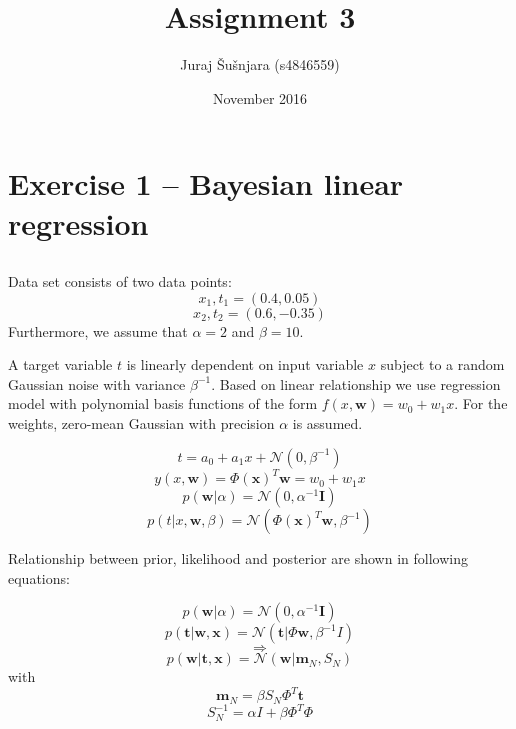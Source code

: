 \documentclass{article}
\title{Assignment 3}
\author{Juraj Šušnjara (s4846559)}
\date{November 2016}
\begin{document}
\maketitle

\section{Exercise 1 – Bayesian linear regression}
\subsection{}

Data set consists of two data points:
\begin{equation}
    {x_1, t_1} = (0.4, 0.05)
\end{equation}
\begin{equation}
    {x_2, t_2} = (0.6, -0.35)
\end{equation}
Furthermore, we assume that $\alpha = 2$ and $\beta = 10$.

A target variable $t$ is linearly dependent on input variable $x$ subject to a random Gaussian noise with variance $\beta^{-1}$. Based on linear relationship we use regression model with polynomial basis functions of the form $f(x,\textbf{w}) = w_0 + w_1x$. For the weights, zero-mean Gaussian with precision $\alpha$ is assumed.

\begin{equation}
    t = a_0 + a_1x + \mathcal{N}(0, \beta^{-1})
\end{equation}
\begin{equation}
    \label{eq:basis}
    y(x,\textbf{w}) = \Phi(\textbf{x})^T\textbf{w} = w_0 + w_1x
\end{equation}
\begin{equation}
    p(\textbf{w}|\alpha) = \mathcal{N}(0, \alpha^{-1}\textbf{I})
\end{equation}
\begin{equation}
    p(t|x,\textbf{w},\beta) = \mathcal{N}(\Phi(\textbf{x})^T\textbf{w}, \beta^{-1})
\end{equation}

Relationship between prior, likelihood and posterior are shown in following equations:

\begin{equation}
    p(\textbf{w}|\alpha) = \mathcal{N}(0, \alpha^{-1}\textbf{I})
\end{equation}
\begin{equation}
    p(\textbf{t}|\textbf{w}, \textbf{x}) = \mathcal{N}(\textbf{t}|\Phi\textbf{w}, \beta^{-1}I)
\end{equation}
$$\Rightarrow$$
\begin{equation}
    p(\textbf{w}|\textbf{t},\textbf{x}) = \mathcal{N}(\textbf{w}|\textbf{m}_N, S_N)
\end{equation}
with
\begin{equation}
    \textbf{m}_N = \beta S_N \Phi^T\textbf{t}
\end{equation}
\begin{equation}
    S_N^{-1} = \alpha I + \beta \Phi^T\Phi
\end{equation}
\end{document}
